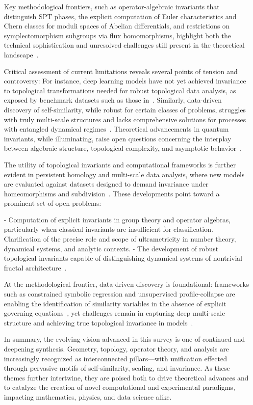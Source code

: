 \documentclass[sigconf]{acmart}
\begin{document}
Key methodological frontiers, such as operator-algebraic invariants that distinguish SPT phases, the explicit computation of Euler characteristics and Chern classes for moduli spaces of Abelian differentials, and restrictions on symplectomorphism subgroups via flux homomorphisms, highlight both the technical sophistication and unresolved challenges still present in the theoretical landscape~\cite{ref86, ref87}.

Critical assessment of current limitations reveals several points of tension and controversy: For instance, deep learning models have not yet achieved invariance to topological transformations needed for robust topological data analysis, as exposed by benchmark datasets such as those in~\cite{ref26}. Similarly, data-driven discovery of self-similarity, while robust for certain classes of problems, struggles with truly multi-scale structures and lacks comprehensive solutions for processes with entangled dynamical regimes~\cite{ref65, ref30}. Theoretical advancements in quantum invariants, while illuminating, raise open questions concerning the interplay between algebraic structure, topological complexity, and asymptotic behavior~\cite{ref87, ref89, ref90}.

The utility of topological invariants and computational frameworks is further evident in persistent homology and multi-scale data analysis, where new models are evaluated against datasets designed to demand invariance under homeomorphisms and subdivision~\cite{ref36}. These developments point toward a prominent set of open problems:

- Computation of explicit invariants in group theory and operator algebras, particularly when classical invariants are insufficient for classification.
- Clarification of the precise role and scope of ultrametricity in number theory, dynamical systems, and analytic contexts.
- The development of robust topological invariants capable of distinguishing dynamical systems of nontrivial fractal architecture~\cite{ref86, ref87, ref89, ref90}.

At the methodological frontier, data-driven discovery is foundational: frameworks such as constrained symbolic regression and unsupervised profile-collapse are enabling the identification of similarity variables in the absence of explicit governing equations~\cite{ref65}, yet challenges remain in capturing deep multi-scale structure and achieving true topological invariance in models~\cite{ref26, ref30}.

In summary, the evolving vision advanced in this survey is one of continued and deepening synthesis. Geometry, topology, operator theory, and analysis are increasingly recognized as interconnected pillars---with unification effected through pervasive motifs of self-similarity, scaling, and invariance. As these themes further intertwine, they are poised both to drive theoretical advances and to catalyze the creation of novel computational and experimental paradigms, impacting mathematics, physics, and data science alike.
\end{document}

